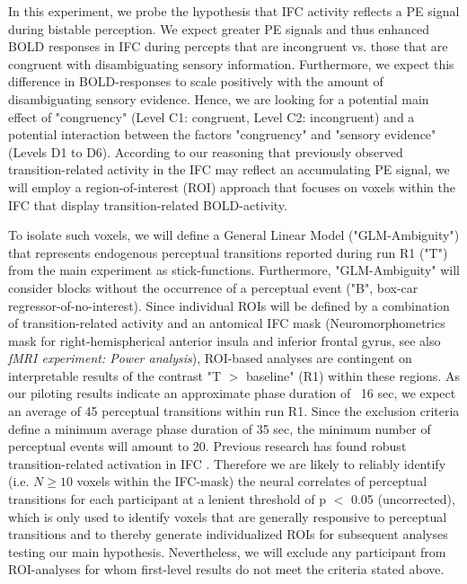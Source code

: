 \documentclass[12pt]{article}
\begin{document}
In this experiment, we probe the hypothesis that IFC activity reflects a PE signal during bistable perception. We expect greater PE signals and thus enhanced BOLD responses in IFC during percepts that are incongruent vs. those that are congruent with disambiguating sensory information. Furthermore, we expect this difference in BOLD-responses to scale positively with the amount of disambiguating sensory evidence. Hence, we are looking for a potential main effect of "congruency" (Level C1: congruent, Level C2: incongruent) and a potential interaction between the factors "congruency" and "sensory evidence" (Levels D1 to D6). According to our reasoning that previously observed transition-related activity in the IFC \parencite{Brascamp2018} may reflect an accumulating PE signal, we will employ a region-of-interest (ROI) approach that focuses on voxels within the IFC that display transition-related BOLD-activity.  

To isolate such voxels, we will define a General Linear Model ("GLM-Ambiguity") that represents endogenous perceptual transitions reported during run R1 ("T") from the main experiment as stick-functions. Furthermore, "GLM-Ambiguity" will consider blocks without the occurrence of a perceptual event ("B", box-car regressor-of-no-interest). Since individual ROIs will be defined by a combination of transition-related activity and an antomical IFC mask (Neuromorphometrics mask for right-hemispherical anterior insula and inferior frontal gyrus, see  also \textit{fMRI experiment: Power analysis}),  ROI-based analyses are contingent on interpretable results of the contrast "T $>$ baseline" (R1) within these regions. As our piloting results indicate an approximate phase duration of ~16 sec, we expect an average of 45 perceptual transitions within run R1. Since the exclusion criteria define a minimum average phase duration of 35 sec, the minimum number of perceptual events will amount to 20. Previous research has found robust transition-related activation in IFC \parencite{Lumer1998, Knapen2011, Weilnhammer2013}. Therefore we are likely to reliably identify (i.e. $N \geq 10$ voxels within the IFC-mask) the neural correlates of perceptual transitions for each participant at a lenient threshold of p $<$ 0.05 (uncorrected), which is only used to identify voxels that are generally responsive to perceptual transitions and to thereby generate individualized ROIs for subsequent analyses testing our main hypothesis. Nevertheless, we will exclude any participant from ROI-analyses for whom first-level results do not meet the criteria stated above.
\end{document}
